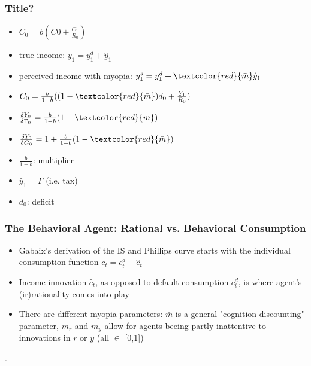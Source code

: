 \documentclass{beamer}
\begin{document}
\begin{frame}
\frametitle{Title?}
\begin{itemize}
\item $C_{0}=b(C{0}+\frac {C_{1}}{R_{0}})$
\item true income: $y_{1}=y_{1}^{d}+\hat y_{1}$
\item perceived income with myopia: $y_{1}^{s}=y_{1}^{d}+\textcolor{red}{\bar m}\hat y_{1}$
\item $C_{0}=\frac {b}{1-b}((1- \textcolor{red}{\bar m})d_{0}+\frac {Y_{1}}{R_{0}})$
\item $\frac{\delta Y_{0}}{\delta \Gamma_{0}}=\frac{b}{1-b}(1-\textcolor{red}{\bar m})$
\item $\frac{\delta Y_{0}}{\delta G_{0}}=1+\frac{b}{1-b}(1-\textcolor{red}{\bar m})$
\item $\frac{b}{1-b}$: multiplier
\item $\hat y_{1}=\Gamma$ (i.e. tax)
\item $d_{0}$: deficit
\end{itemize}

\end{frame}


\begin{frame}
\frametitle{The Behavioral Agent: Rational vs. Behavioral Consumption}
\begin{itemize}
\item Gabaix's derivation of the IS and Phillips curve starts with the individual consumption function $c_{t}=c_{t}^{d}+\hat c_{t}$
\item  Income innovation $\hat c_{t}$, as opposed to default consumption $c_{t}^{d}$, is where agent's (ir)rationality comes into play
\item There are different myopia parameters: $\bar m$ is a general "cognition discounting" parameter, $m_{r}$ and $m_{y}$ allow for agents beeing partly inattentive to innovations in $r$ or $y$ (all $\in$ [0,1])

\end{itemize}.

\end{frame}

\end{document}

